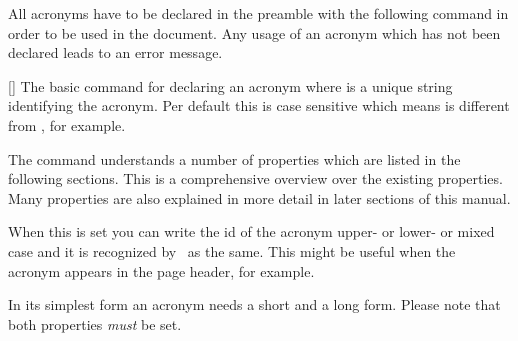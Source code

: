 \documentclass{acro-manual}
\begin{document}
All acronyms have to be declared in the preamble with the following command in
order to be used in the document. Any usage of an acronym which has not been
declared leads to an error message.
\begin{commands}
  []
    The basic command for declaring an acronym where  is a unique
    string identifying the acronym.  Per default this is case sensitive which
    means  is different from , for example.
\end{commands}
The command understands a number of properties which are listed in the
following sections.  This is a comprehensive overview over the existing
properties. Many properties are also explained in more detail in later
sections of this manual.
\begin{options}
    When this is set you can write the \ac{id} of the acronym upper- or lower-
    or mixed case and it is recognized by \acro\ as the same.  This might be
    useful when the acronym appears in the page header, for example.
\end{options}

\begin{bewareofthedog}
  In its simplest form an acronym needs a short and a long form.  Please note
  that both properties \emph{must} be set.
\end{bewareofthedog}
\end{document}
